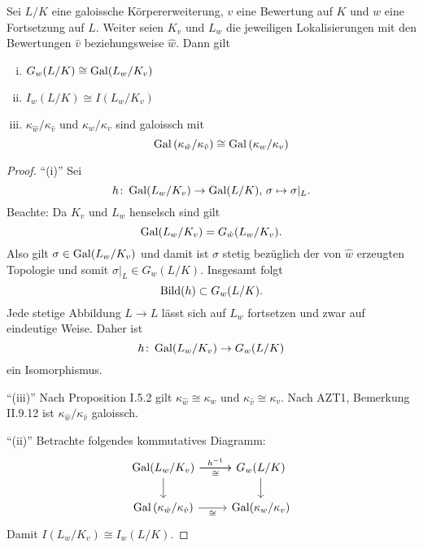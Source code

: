 \begin{Satz}
	Sei $L/K$ eine galoissche Körpererweiterung, $v$ eine Bewertung auf $K$ und $w$ eine Fortsetzung auf $L$. Weiter seien $K_v$ und $L_w$ die jeweiligen Lokalisierungen mit den Bewertungen $\hat{v}$ beziehungsweise $\hat{w}$. Dann gilt
	\begin{enumerate}[(i)]
		\item $G_w(L/K) \cong \operatorname{Gal}(L_w/K_v)$
		\item $I_w(L/K) \cong I(L_w/K_v)$
		\item $\kappa_{\hat{w}} / \kappa_{\hat{v}}$ und $\kappa_w / \kappa_v$ sind galoissch mit
		\[ \operatorname{Gal} \left( \kappa_{\hat{w}} / \kappa_{\hat{v}} \right)
		\cong \operatorname{Gal} \left( \kappa_w / \kappa_v \right)
		\]
	\end{enumerate}
\end{Satz}

\begin{proof}
	\enquote{(i)} Sei
	\[ h \colon \operatorname{Gal}(L_w/K_v) \to \operatorname{Gal}(L/K), \, \sigma \mapsto \sigma|_L.
	\]
	Beachte: Da $K_v$ und $L_w$ henselsch sind gilt
	\[ \operatorname{Gal}(L_w/K_v)=G_{\hat{w}}(L_w/K_v).
	\]
	Also gilt $\sigma \in \operatorname{Gal}(L_w/K_v)$ und damit ist $\sigma$ stetig bezüglich der von $\hat{w}$ erzeugten Topologie und somit $\sigma|_L \in G_w(L/K)$.
	Insgesamt folgt
	\[ \operatorname{Bild} (h) \subset G_w(L/K).
	\]
	Jede stetige Abbildung $L\to L$ lässt sich auf $L_w$ fortsetzen und zwar auf eindeutige Weise.
	Daher ist
	\[ h \colon \operatorname{Gal}(L_w/K_v) \to G_w(L/K)
	\]
	ein Isomorphismus.
	
	\bigskip \enquote{(iii)}
	Nach Proposition I.5.2 gilt $\kappa_{\hat{w}} \cong \kappa_w$ und $\kappa_{\hat{v}} \cong \kappa_v$. Nach AZT1, Bemerkung II.9.12 ist $\kappa_{\hat{w}} / \kappa_{\hat{v}}$ galoissch.
	
	\bigskip \enquote{(ii)}
	Betrachte folgendes kommutatives Diagramm:
	\[ \begin{tikzcd}
	\Gal(L_w/K_v)
		\arrow{r}{h^{-1}}
		\arrow[swap]{r}{\cong}
		\arrow{d}
	& G_w(L/K)
		\arrow{d}
	\\
	\Gal\left(  \kappa_{\hat{w}} / \kappa_{\hat{v}} \right)
		\arrow[swap]{r}{\cong}
	& \Gal(\kappa_w / \kappa_v)
	\end{tikzcd}
	\]
	Damit $I(L_w/K_v) \cong I_w(L/K)$.
\end{proof}

